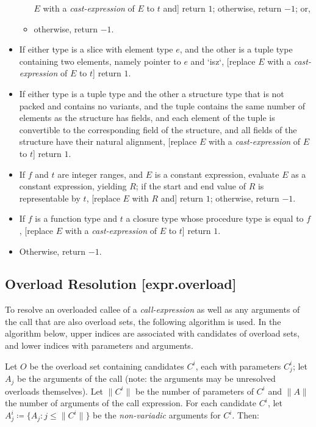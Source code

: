 \documentclass[a4paper, 12pt, oneside, final]{article}
\begin{document}
\begin{itemize}
\begin{itemize}
              $E$ with a \emph{cast-expression} of $E$ to $t$ and] return $1$; otherwise, return $-1$; or,
        \item otherwise, return $-1$.
    \end{itemize}
    \item If either type is a slice with element type $e$, and the other is a tuple type containing two elements, namely
          pointer to $e$ and `isz`, [replace $E$ with a \emph{cast-expression} of $E$ to $t$] return $1$.
    \item If either type is a tuple type and the other a structure type that is not packed and contains no variants, and the
          tuple contains the same number of elements as the structure has fields, and each element of the tuple is convertible
          to the corresponding field of the structure, and all fields of the structure have their natural alignment, [replace
          $E$ with a \emph{cast-expression} of $E$ to $t$] return $1$.
    \item If $f$ and $t$ are integer ranges, and $E$ is a constant expression, evaluate $E$ as a constant expression, yielding $R$;
          if the start and end value of $R$ is representable by $t$, [replace $E$ with $R$ and] return $1$; otherwise, return $-1$.
    \item If $f$ is a function type and $t$ a closure type whose procedure type is equal to $f$, [replace $E$ with a \emph{cast-expression}
          of $E$ to $t$] return $1$.
    \item Otherwise, return $-1$.
\end{itemize}

\subsection{Overload Resolution [expr.overload]}
To resolve an overloaded callee of a \emph{call-expression} as well as any arguments of the call that are
also overload sets, the following algorithm is used. In the algorithm below, upper indices are associated
with candidates of overload sets, and lower indices with parameters and arguments.

Let $O$ be the overload set containing candidates $C^i$, each with parameters $C^i_j$; let $A_j$ be the
arguments of the call (note: the arguments may be unresolved overloads themselves). Let $\|C^i\|$ be the
number of parameters of $C^i$ and $\|A\|$ the number of arguments of the call expression. For each
candidate $C^i$, let $A^i_j \coloneqq \{ A_j : j \leq \|C^i\| \}$ be the \textit{non-variadic} arguments for $C^i$. Then:
\end{document}
